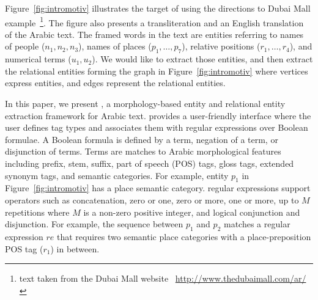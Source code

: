 

Figure~\ref{fig:intromotiv} illustrates the target of \framework using 
the directions to Dubai Mall example~\footnote{text taken from the Dubai 
Mall website ~\url{http://www.thedubaimall.com/ar/}}.
The figure also presents a transliteration and an English translation of 
the Arabic text.
The framed words in the text are entities referring to names of people 
($n_1,n_2,n_3$), 
names of places ($p_1,\dots,p_7$), 
relative positions ($r_1,\dots,r_4$), 
and numerical terms ($u_1,u_2$). 
We would like to extract those entities, and then extract
the relational entities forming the graph in Figure~\ref{fig:intromotiv} 
where vertices express entities, 
and edges represent the relational entities.



In this paper, 
we present \framework, a morphology-based entity and relational entity
extraction framework for Arabic text.
\framework provides a user-friendly interface where the user defines tag types 
and associates them with
regular expressions over 
Boolean formulae.
%
A Boolean formula is defined by a term, negation of a term, or disjunction of terms.
Terms are matches to Arabic morphological features including 
prefix, stem, suffix, part of speech (POS) tags, gloss tags, extended synonym 
tags, and semantic categories.
For example, entity $p_1$ in Figure~\ref{fig:intromotiv} has a place semantic 
category.
\framework regular expressions support operators such as concatenation, 
zero or one, zero or more, one or more, up to $M$ repetitions where $M$ is 
a non-zero positive integer, and logical conjunction and disjunction.
For example, the sequence between $p_1$ and $p_2$ matches a regular expression $re$ 
that requires two semantic place categories with a place-preposition POS 
tag ($r_1$) in between.

